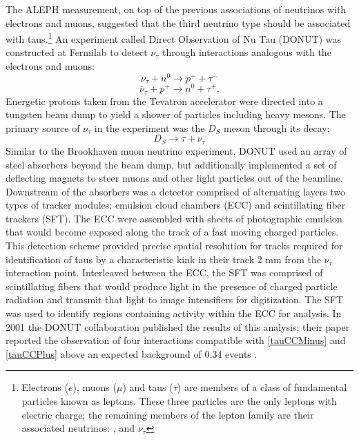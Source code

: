 The ALEPH measurement, on top of the previous associations of neutrinos with
electrons and muons, suggested that the third neutrino type should be
associated with taus.\footnote{Electrons ($e$), muons ($\mu$) and taus ($\tau$)
are members of a class of fundamental particles known as leptons.  These three
particles are the only leptons with electric charge; the remaining members of
the lepton family are their associated neutrinos: \nue, \numu and $\nu_\tau$  }
An experiment called Direct Observation of Nu Tau (DONUT) was constructed at
Fermilab to detect $\nu_\tau$ through interactions analogous with the electrons
and muons:
\begin{equation} \label{tauCCMinus}\nu_\tau + n^0 \rightarrow  p^+ + \tau^- \end{equation}
\begin{equation} \label{tauCCPlus}\bar{\nu}_\tau + p^+ \rightarrow n^0 + \tau^+ . \end{equation}
Energetic protons taken from the Tevatron accelerator were directed into a
tungsten beam dump to yield a shower of particles including heavy mesons.  The
primary source of $\nu_\tau$ in the experiment was the $D_S$ meson through its
decay:
\begin{equation}\label{nuTauDS}
D_S \rightarrow \tau + \nu_\tau
\end{equation}
Similar to the Brookhaven muon neutrino experiment, DONUT used an array of
steel absorbers beyond the beam dump, but additionally implemented a set of
deflecting magnets to steer muons and other light particles out of the
beamline.  Downstream of the absorbers was a detector comprised of alternating
layers two types of tracker modules: emulsion cloud chambers (ECC) and
scintillating fiber trackers (SFT).  The ECC were assembled with sheets of
photographic emulsion that would become exposed along the track of a fast
moving charged particles.  This detection scheme provided precise spatial
resolution for tracks required for identification of taus by a characteristic
kink in their track 2 mm from the $\nu_\tau$ interaction point.  Interleaved
between the ECC, the SFT was comprised of scintillating fibers that would
produce light in the presence of charged particle radiation and transmit that
light to image intensifiers for digitization.  The SFT was used to identify
regions containing activity within the ECC for analysis.  In 2001 the DONUT
collaboration published the results of this analysis; their paper reported the
observation of four interactions compatible with \eqref{tauCCMinus} and
\eqref{tauCCPlus} above an expected background of 0.34 events  \cite{nuTau}.

